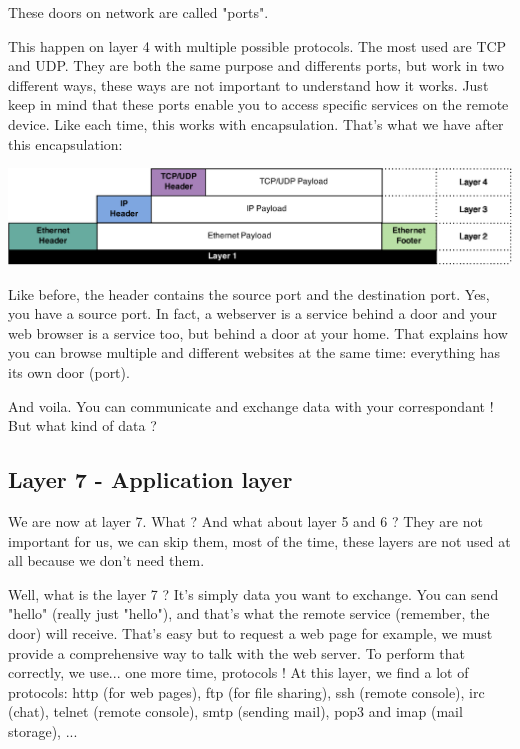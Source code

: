\documentclass{article}
\begin{document}
	These doors on network are called "ports".
	
	This happen on layer 4 with multiple possible protocols. The most used are TCP and UDP. They are both the same purpose
	and differents ports, but work in two different ways, these ways are not important to understand how it works.
	Just keep in mind that these ports enable you to access specific services on the remote device. Like each time,
	this works with encapsulation. That's what we have after this encapsulation:
	\begin{center}
	\includegraphics[scale=0.35]{content/layer4.eps}
	\end{center}
	
	Like before, the header contains the source port and the destination port. Yes, you have a source port. In fact,
	a webserver is a service behind a door and your web browser is a service too, but behind a door at your home.
	That explains how you can browse multiple and different websites at the same time: everything has its own door (port).
	
	And voila. You can communicate and exchange data with your correspondant ! But what kind of data ?
	
	\subsection{Layer 7 - Application layer}
	
	We are now at layer 7. What ? And what about layer 5 and 6 ? They are not important for us, we can skip them, most
	of the time, these layers are not used at all because we don't need them.
	
	Well, what is the layer 7 ? It's simply data you want to exchange. You can send "hello" (really just "hello"),
	and that's what the remote service (remember, the door) will receive. That's easy but to request a web page for example,
	we must provide a comprehensive way to talk with the web server. To perform that correctly, we use... one more time,
	protocols ! At this layer, we find a lot of protocols: http (for web pages), ftp (for file sharing),
	ssh (remote console), irc (chat), telnet (remote console), smtp (sending mail), pop3 and imap (mail storage), ...
	
\end{document}
